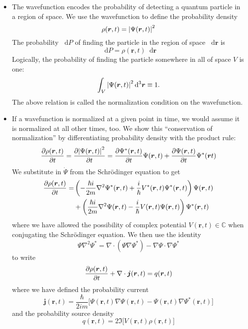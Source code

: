 \documentclass[11pt, a4paper]{article}
\newcommand{\diff}{\mathop{}\!\mathrm{d}} %
\newcommand{\dr}{\diff^{3} \r}  %
\renewcommand{\div}{\nabla \cdot}
\renewcommand{\grad}{\nabla}
\renewcommand{\laplacian}{\nabla^{2}}
\newcommand{\Schro}{Schr\"{o}dinger\xspace}
\renewcommand{\vec}[1]{\bm{#1}}  %
\renewcommand{\r}{\vec{r}}  %
\renewcommand{\P}{\Psi}  %
\begin{document}
\begin{itemize}
	\item The wavefunction encodes the probability of detecting a quantum particle in a region of space. We use the wavefunction to define the probability density
	\begin{equation*}
		\rho (\r, t) = \abs{\P(\r, t)}^{2}
	\end{equation*}
	The probability $ \diff P $ of finding the particle in the region of space $ \diff \r $ is
	\begin{equation*}
		\diff P = \rho(\r, t) \diff \r
	\end{equation*}
	Logically, the probability of finding the particle somewhere in all of space $ V $ is one:
	\begin{equation*}
		\int_{V} \abs{\P(\r, t)}^{2}\dr \equiv 1.
	\end{equation*}
	The above relation is called the normalization condition on the wavefunction.
	
	\item If a wavefunction is normalized at a given point in time, we would assume it is normalized at all other times, too. We show this ``conservation of normalization'' by differentiating probability density with the product rule:
	\begin{align*}
		  \pdv{\rho(\r, t)}{t} = \pdv{\abs{\P(\r, t)}^{2}}{t} &= \pdv{\P^{*}(\r, t)}{t} \P(\r, t) + \pdv{\P(\r, t)}{t} \P^{*}(\r t)\\
	\end{align*}
	We substitute in $ \dot{\P} $ from the \Schro equation to get
	\begin{align*}
		\pdv{\rho(\r, t)}{t} = &\left(- \frac{\hbar i}{2m}\laplacian \P^{*}(\r, t) + \frac{i}{\hbar} V^{*}(\r, t)\Psi^{*}(\r, t)\right)\P(\r, t) \\
		& + \left(\frac{\hbar i}{2m}\laplacian \P(\r, t) - \frac{i}{\hbar} V(\r, t)\Psi(\r, t)\right)\Psi^{*}(\r, t)
	\end{align*}
	where we have allowed the possibility of complex potential $ V(\r, t) \in \mathbb{C} $ when conjugating the \Schro equation. We then use the identity
	\begin{equation*}
		\P \laplacian \P^{*} = \div (\P \grad \P^{*}) - \grad \P \cdot \grad \P^{*}
	\end{equation*}
	to write 
	\begin{equation*}
		\pdv{\rho(\r, t)}{t} + \div \vec{j}(\r, t) = q(\r, t)
	\end{equation*}
	where we have defined the probability current
	\begin{equation*}
		\vec{j}(\r, t) = \frac{\hbar}{2im}\big[\P(\r, t)\grad\P(\r, t) - \P(\r, t)\grad\P^{*}(\r, t)\big]
	\end{equation*}
	and the probability source density
	\begin{equation*}
		q(\r, t) = 2 \Im \big[V(\r, t)\rho(\r, t)\big]
	\end{equation*}
	

\end{itemize}
\end{document}
